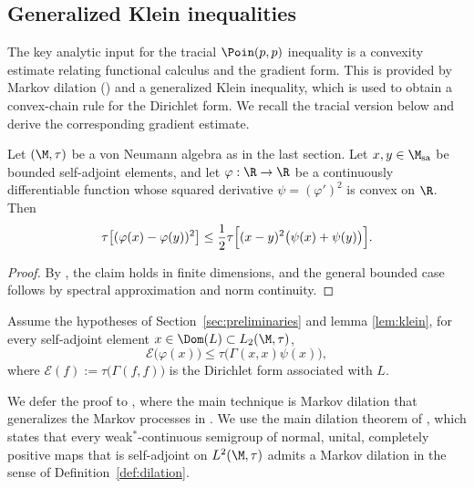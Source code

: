 \documentclass[sn-mathphys-num]{sn-jnl}
\begin{document}
\subsection{Generalized Klein inequalities}\label{sec:Klein}
The key analytic input for the tracial $\Poin(p,p)$ inequality is a convexity estimate
relating functional calculus and the gradient form.
This is provided by Markov dilation () and a generalized Klein inequality, which is used to obtain a convex-chain rule
for the Dirichlet form.
We recall the tracial version below and derive the corresponding gradient estimate.
\medskip
\begin{lemma}
\label{lem:klein}
Let $(\M,\tau)$ be a von Neumann algebra as in the last section.  Let
$
x,y\in\M_{\mathrm{sa}}
$
be bounded self-adjoint elements, and let $\varphi:\R\to\R$ be a continuously differentiable function whose squared derivative
$
\psi = (\varphi')^2
$
is convex on $\R$.  Then
\[
    \tau   \bigl[(\varphi(x)-\varphi(y))^2\bigr]
 \le
\frac12
 \tau   \Bigl[(x-y)^2\bigl(\psi(x)+\psi(y)\bigr)\Bigr].
\]
\end{lemma}
\begin{proof}
By \cite[Prop.~3]{petz_survey_1994}, the claim holds in finite dimensions, and the general bounded case follows by spectral approximation and norm continuity.
\end{proof}
\begin{proposition}
\label{prop:convex-chain}
Assume the hypotheses of Section~\ref{sec:preliminaries} and lemma \ref{lem:klein},
for every self-adjoint element
$x\in\Dom(L)\subset L_{2}(\M,\tau)$,
\[
  \mathscr E\bigl(\varphi(x)\bigr)
   \le
  \tau   \bigl(\Gamma(x,x)  \psi(x)\bigr),
\]
where
$\mathscr E(f):=\tau   \bigl(\Gamma(f,f)\bigr)$ is the Dirichlet form
associated with $L$.
\end{proposition}
We defer the proof to , where the main technique is Markov dilation that generalizes the Markov processes in \cite{huang2021poincare}.
We use the main dilation theorem of
\cite{JungeRicardShlyakhtenko2025}, which states that every weak$^*$-continuous
semigroup of normal, unital, completely positive maps that is self-adjoint on
$L^2(\M,\tau)$ admits a Markov dilation in the sense of
Definition~\ref{def:dilation}.
\end{document}
